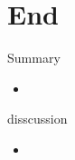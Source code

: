 \section{End}
\begin{frame}{Summary}
  \begin{itemize}
    \item 
  \end{itemize}
\end{frame}
\begin{frame}{disscussion}
  \begin{itemize}
    \item 
  \end{itemize}
\end{frame}